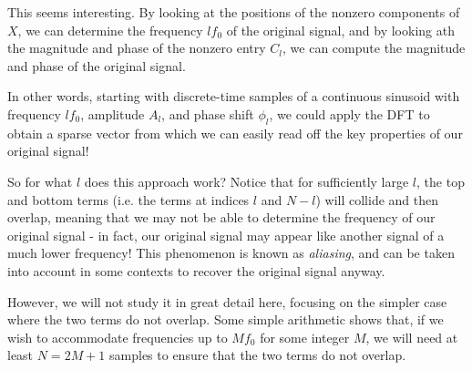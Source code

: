 \documentclass[letterpaper]{article}
\theoremstyle{remark}
\begin{document}
This seems interesting. By looking at the positions of the nonzero components of $X$, we can determine the frequency $lf_0$ of the original signal, and by looking ath the magnitude and phase of the nonzero entry $C_l$, we can compute the magnitude and phase of the original signal. 

In other words, starting with discrete-time samples of a continuous sinusoid with frequency $lf_0$, amplitude $A_l$, and phase shift $\phi_l$, we could apply the DFT to obtain a sparse vector from which we can easily read off the key properties of our original signal!

So for what $l$ does this approach work? Notice that for sufficiently large $l$, the top and bottom terms (i.e. the terms at indices $l$ and $N-l$) will collide and then overlap, meaning that we may not be able to determine the frequency of our original signal - in fact, our original signal may appear like another signal of a much lower frequency! This phenomenon is known as \emph{aliasing}, and can be taken into account in some contexts to recover the original signal anyway. 

However, we will not study it in great detail here, focusing on the simpler case where the two terms do not overlap. Some simple arithmetic shows that, if we wish to accommodate frequencies up to $Mf_0$ for some integer $M$, we will need at least $N = 2M + 1$ samples to ensure that the two terms do not overlap.
\end{document}
